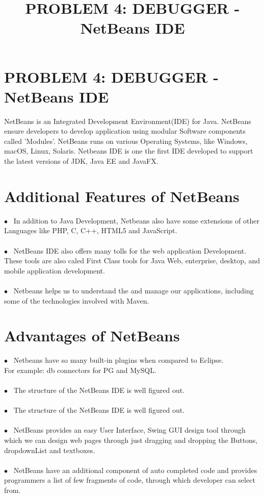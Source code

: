 \documentclass[10pt]{article}
\title{{\large\textbf{\normalsize PROBLEM 4: DEBUGGER - NetBeans IDE}}}
\begin{document}
\section*{{PROBLEM 4: DEBUGGER - NetBeans IDE}}

NetBeans is an Integrated Development Environment(IDE) for Java. NetBeans ensure developers to develop application using modular Software components called 'Modules'. NetBeans runs on various Operating Systems, like Windows, macOS, Linux, Solaris. Netbeans IDE is one the first IDE developed to support the latest versions of JDK, Java EE and JavaFX.

\section*{\normalsize Additional Features of NetBeans}

$\bullet$~ In addition to Java Development, Netbeans also have some extensions of other Languages like PHP, C, C++, HTML5 and JavaScript.
\\
\\
$\bullet$~ NetBeans IDE also offers many tolls for the web application Development.
\\ These tools are also caled First Class tools for Java Web, enterprise, desktop, and mobile application development.
\\
\\
$\bullet$~ Netbeans helps us to understand the and manage our applications, including some of the technologies involved with Maven.

\section*{\normalsize Advantages of NetBeans}

$\bullet$~ Netbeans have so many built-in plugins when compared to Eclipse.
\\ For example: db connectors for PG and MySQL.
\\
\\
$\bullet$~ The structure of the NetBeans IDE is well figured out.
\\
\\
$\bullet$~ The structure of the NetBeans IDE is well figured out.
\\
\\
$\bullet$~ NetBeans provides an easy User Interface, Swing GUI design tool through which we can design web pages through just dragging and dropping the Buttons, dropdownList and textboxes.
\\
\\
$\bullet$~ NetBeans have an additional component of auto completed code and provides programmers a list of few fragments of code, through which developer can select from.
\end{document}

